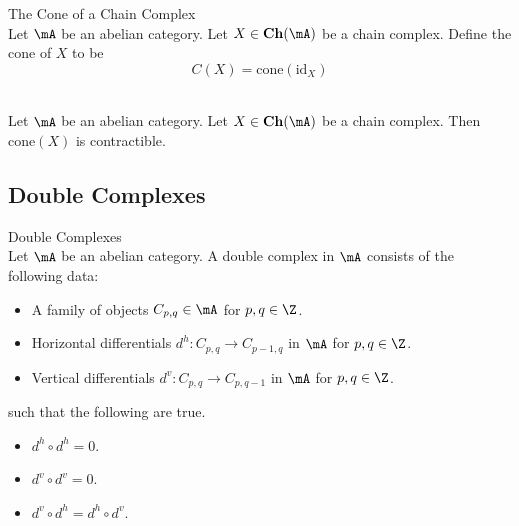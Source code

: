 \documentclass[a4paper]{article}
\begin{document}
\begin{defn}{The Cone of a Chain Complex}{}\\
Let $\mA$ be an abelian category. Let $X\in\bold{Ch}(\mA)$ be a chain complex. Define the cone of $X$ to be $$C(X)=\text{cone}(\text{id}_X)$$
\end{defn}

\begin{lmm}{}{}\\
Let $\mA$ be an abelian category. Let $X\in\bold{Ch}(\mA)$ be a chain complex. Then $\text{cone}(X)$ is contractible. 
\end{lmm}

\subsection{Double Complexes}
\begin{defn}{Double Complexes}{}\\
Let $\mA$ be an abelian category. A double complex in $\mA$ consists of the following data: 
\begin{itemize}
\item A family of objects $C_{p,q}\in\mA$ for $p,q\in\Z$. 
\item Horizontal differentials $d^h:C_{p,q}\to C_{p-1,q}$ in $\mA$ for $p,q\in\Z$. 
\item Vertical differentials $d^v:C_{p,q}\to C_{p,q-1}$ in $\mA$ for $p,q\in\Z$. 
\end{itemize}
such that the following are true. 
\begin{itemize}
\item $d^h\circ d^h=0$. 
\item $d^v\circ d^v=0$. 
\item $d^v\circ d^h=d^h\circ d^v$. 
\end{itemize}
\end{defn}
\end{document}
